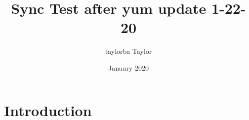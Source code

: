 \documentclass{article}
\title{Sync Test after yum update 1-22-20}
\author{taylorba Taylor}
\date{January 2020}
\begin{document}
\maketitle

\section{Introduction}
\end{document}
